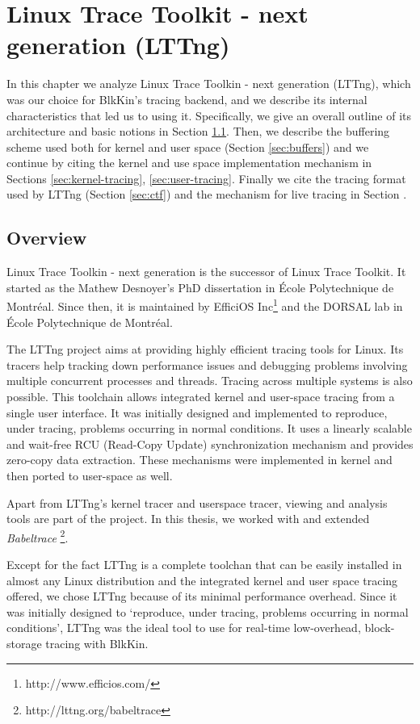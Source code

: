 \chapter{Linux Trace Toolkit - next generation (LTTng)}\label{ch:lttng}

In this chapter we analyze Linux Trace Toolkin - next generation (LTTng), which
was our choice for BlkKin's tracing backend, and we describe its internal
characteristics that led us to using it. Specifically, we give an overall
outline of its architecture and basic notions in Section
\ref{sec:lttng-overview}. Then, we describe the buffering scheme used both for
kernel and user space (Section \ref{sec:buffers}) and we continue by citing the
kernel and use space implementation mechanism in Sections
\ref{sec:kernel-tracing}, \ref{sec:user-tracing}. Finally we cite the tracing
format used by LTTng (Section \ref{sec:ctf}) and the mechanism for live tracing
in Section \label{sec:relayd}.

\section{Overview}\label{sec:lttng-overview}

Linux Trace Toolkin - next generation is the successor of Linux Trace Toolkit.
It started as the Mathew Desnoyer's PhD dissertation \cite{desnoyer} in École
Polytechnique de Montréal. Since then, it is maintained by EfficiOS
Inc\footnote{http://www.efficios.com/} and the DORSAL lab in  École
Polytechnique de Montréal.

The LTTng project aims at providing highly efficient tracing tools for Linux.
Its tracers help tracking down performance issues and debugging problems
involving multiple concurrent processes and threads. Tracing across multiple
systems is also possible. This toolchain allows integrated kernel and user-space
tracing from a single user interface. It was initially designed and implemented
to reproduce, under tracing, problems occurring in normal conditions. It uses a
linearly scalable and wait-free RCU (Read-Copy Update) synchronization mechanism
and provides zero-copy data extraction. These mechanisms were implemented in
kernel and then ported to user-space as well.
 
Apart from LTTng's kernel tracer and userspace tracer, viewing and analysis
tools are part of the project. In this thesis, we worked with and extended 
\textit{Babeltrace} \footnote{http://lttng.org/babeltrace}.

Except for the fact LTTng is a complete toolchan that can be easily installed in
almost any Linux distribution and the integrated kernel and user space tracing
offered, we chose LTTng because of its minimal performance overhead. Since it
was initially designed to `reproduce, under tracing, problems occurring in
normal conditions', LTTng was the ideal tool to use for real-time low-overhead,
block-storage tracing with BlkKin.

